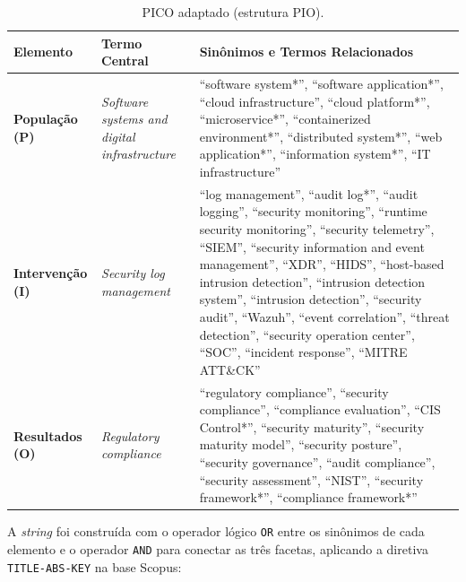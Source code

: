 \begin{table}[!htbp]
    \centering
    \caption{PICO adaptado (estrutura PIO).}
    \label{tab:rsl_protocolo_pio}
    \small
    \begin{tabular}{p{2.4cm}p{3.4cm}p{8.7cm}}
        \hline
        \textbf{Elemento} & \textbf{Termo Central} & \textbf{Sinônimos e Termos Relacionados} \\ \hline
        \textbf{População (P)} & \textit{Software systems and digital infrastructure} & ``software system*'', ``software application*'', ``cloud infrastructure'', ``cloud platform*'', ``microservice*'', ``containerized environment*'', ``distributed system*'', ``web application*'', ``information system*'', ``IT infrastructure'' \\ \hline
        \textbf{Intervenção (I)} & \textit{Security log management} & ``log management'', ``audit log*'', ``audit logging'', ``security monitoring'', ``runtime security monitoring'', ``security telemetry'', ``SIEM'', ``security information and event management'', ``XDR'', ``HIDS'', ``host-based intrusion detection'', ``intrusion detection system'', ``intrusion detection'', ``security audit'', ``Wazuh'', ``event correlation'', ``threat detection'', ``security operation center'', ``SOC'', ``incident response'', ``MITRE ATT\&CK'' \\ \hline
        \textbf{Resultados (O)} & \textit{Regulatory compliance} & ``regulatory compliance'', ``security compliance'', ``compliance evaluation'', ``CIS Control*'', ``security maturity'', ``security maturity model'', ``security posture'', ``security governance'', ``audit compliance'', ``security assessment'', ``NIST'', ``security framework*'', ``compliance framework*'' \\ \hline
    \end{tabular}
\end{table}
\FloatBarrier

A \textit{string} foi construída com o operador lógico \texttt{OR} entre os sinônimos de cada elemento e o operador \texttt{AND} para conectar as três facetas, aplicando a diretiva \texttt{TITLE-ABS-KEY} na base Scopus:

